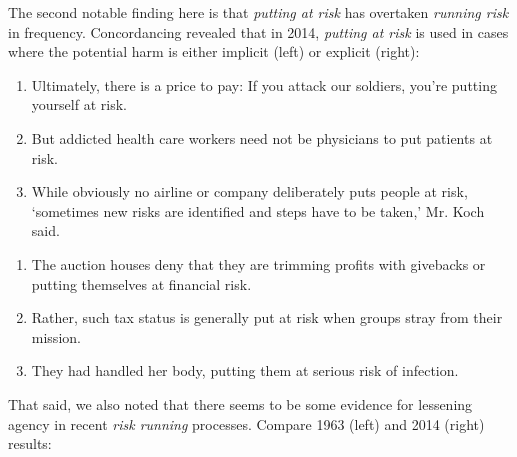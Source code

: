     The second notable finding here is that \emph{putting at risk} has overtaken \emph{running risk} in frequency. Concordancing revealed that in 2014, \emph{putting at risk} is used in cases where the potential harm is either implicit (left) or explicit (right):
    \begin{multicols}{2}
    \begin{enumerate}  [before=\color{black}\ttfamily] \setlength\itemsep{0em} \small
    \item Ultimately, there is a price to pay: If you attack our soldiers, you're putting yourself at risk.
    \item But addicted health care workers need not be physicians to put patients at risk.
    \item While obviously no airline or company deliberately puts people at risk, `sometimes new risks are identified and steps have to be taken,' Mr. Koch said.
    \end{enumerate}
    \begin{enumerate}  [before=\color{black}\ttfamily] \setlength\itemsep{0em} \small
    \item The auction houses deny that they are trimming profits with givebacks or putting themselves at financial risk.
    \item Rather, such tax status is generally put at risk when groups stray from their mission.
    \item They had handled her body, putting them at serious risk of infection.
    \end{enumerate}
    \end{multicols}
    \noindent That said, we also noted that there seems to be some evidence for lessening agency in recent \emph{risk running} processes. Compare 1963 (left) and 2014 (right) results:

